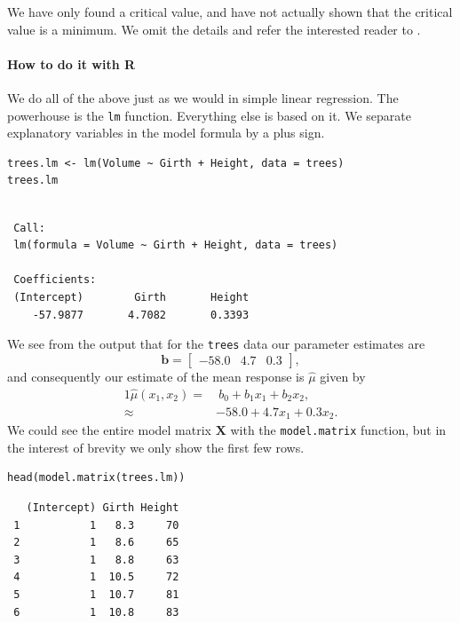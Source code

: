 \documentclass[captions=tableheading]{scrbook}
\begin{document}
\begin{rem}
We have only found a critical value, and have not actually shown that the critical value is a minimum. We omit the details and refer the interested reader to \cite{Rao1999}.
\end{rem}

\paragraph*{How to do it with \textsf{R}}

We do all of the above just as we would in simple linear regression. The powerhouse is the \texttt{lm} function. Everything else is based on it. We separate explanatory variables in the model formula by a plus sign.


\begin{verbatim}
trees.lm <- lm(Volume ~ Girth + Height, data = trees)
trees.lm
\end{verbatim}

\begin{verbatim}
 
 Call:
 lm(formula = Volume ~ Girth + Height, data = trees)
 
 Coefficients:
 (Intercept)        Girth       Height  
    -57.9877       4.7082       0.3393
\end{verbatim}

We see from the output that for the \texttt{trees} data our parameter estimates are 
\[
\mathbf{b}=\begin{bmatrix}-58.0 & 4.7 & 0.3\end{bmatrix},
\] 
and consequently our estimate of the mean response is $\hat{\mu}$ given by 
\begin{alignat}{1}
\hat{\mu}(x_{1},x_{2})= & \ b_{0}+b_{1}x_{1}+b_{2}x_{2},\\
\approx & -58.0+4.7x_{1}+0.3x_{2}.
\end{alignat}
We could see the entire model matrix $\mathbf{X}$ with the \texttt{model.matrix} function, but in the interest of brevity we only show the first few rows. 


\begin{verbatim}
head(model.matrix(trees.lm))
\end{verbatim}

\begin{verbatim}
   (Intercept) Girth Height
 1           1   8.3     70
 2           1   8.6     65
 3           1   8.8     63
 4           1  10.5     72
 5           1  10.7     81
 6           1  10.8     83
\end{verbatim}
\end{document}
